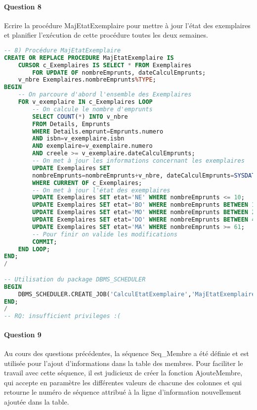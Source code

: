 \documentclass[10pt, oneside]{article}
\begin{document}

\paragraph{Question 8} Ecrire la procédure MajEtatExemplaire pour mettre à jour l'état des exemplaires et planifier l'exécution de cette procédure toutes les deux semaines.

\begin{lstlisting}[language=sql, title=Question 8, label=QV8]
-- 8) Procédure MajEtatExemplaire
CREATE OR REPLACE PROCEDURE MajEtatExemplaire IS 
	CURSOR c_Exemplaires IS SELECT * FROM Exemplaires
		FOR UPDATE OF nombreEmprunts, dateCalculEmprunts;
	v_nbre Exemplaires.nombreEmprunts%TYPE;
BEGIN 
	-- On parcoure d'abord l'ensemble des Exemplaires
	FOR v_exemplaire IN c_Exemplaires LOOP
		-- On calcule le nombre d'emprunts
		SELECT COUNT(*) INTO v_nbre
		FROM Details, Emprunts
		WHERE Details.emprunt=Emprunts.numero
		AND isbn=v_exemplaire.isbn
		AND exemplaire=v_exemplaire.numero
		AND creele >= v_exemplaire.dateCalculEmprunts;
		-- On met à jour les informations concernant les exemplaires
		UPDATE Exemplaires SET
		nombreEmprunts=nombreEmprunts+v_nbre, dateCalculEmprunts=SYSDATE
		WHERE CURRENT OF c_Exemplaires;
		-- On met à jour l'état des exemplaires
		UPDATE Exemplaires SET etat='NE' WHERE nombreEmprunts <= 10;
		UPDATE Exemplaires SET etat='BO' WHERE nombreEmprunts BETWEEN 11 AND 25;
		UPDATE Exemplaires SET etat='MO' WHERE nombreEmprunts BETWEEN 26 AND 40;
		UPDATE Exemplaires SET etat='DO' WHERE nombreEmprunts BETWEEN 41 AND 60;
		UPDATE Exemplaires SET etat='MA' WHERE nombreEmprunts >= 61;
		-- Pour finir on valide les modifications
		COMMIT;
	END LOOP;
END;
/

-- Utilisation du package DBMS_SCHEDULER
BEGIN
	DBMS_SCHEDULER.CREATE_JOB('CalculEtatExemplaire','MajEtatExemplaire', SYSTIMESTAMP, 'systimestamp+14');
END;
/
-- RQ: insufficient privileges :(
\end{lstlisting}


\paragraph{Question 9} Au cours des questions précédentes, la séquence Seq\_Membre a été définie et est utilisée pour l'ajout d'informations dans la table des membres. Pour faciliter le travail avec cette séquence, il est judicieux de créer la fonction AjouteMembre, qui accepte en paramètre les différentes valeurs de chacune des colonnes et qui retourne le numéro de séquence attribué à la ligne d'information nouvellement ajoutée dans la table.
\end{document}
